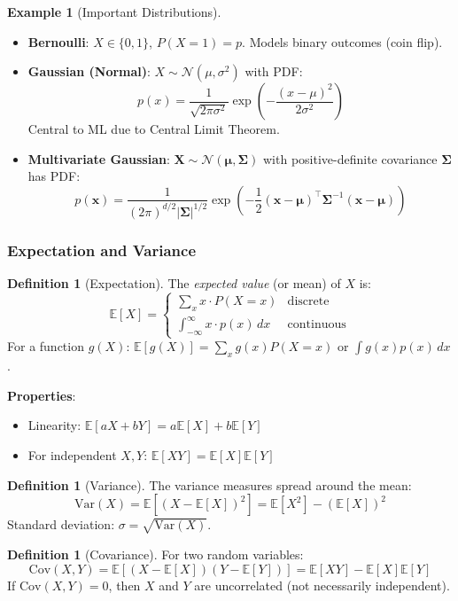 \documentclass[11pt,twoside]{article}
\numberwithin{equation}{section}
\newcommand{\E}{\mathbb{E}}
\newcommand{\Var}{\mathrm{Var}}
\newcommand{\Cov}{\mathrm{Cov}}
\newcommand{\vect}[1]{\bm{#1}}
\newcommand{\mat}[1]{\bm{#1}}
\theoremstyle{plain}
\theoremstyle{definition}
\newtheorem{definition}[theorem]{Definition}
\newtheorem{example}[theorem]{Example}
\theoremstyle{remark}
\begin{document}
\begin{example}[Important Distributions]
\begin{itemize}
\item \textbf{Bernoulli}: $X \in \{0,1\}$, $P(X=1) = p$. Models binary outcomes (coin flip).
\item \textbf{Gaussian (Normal)}: $X \sim \mathcal{N}(\mu, \sigma^2)$ with PDF:
\[
p(x) = \frac{1}{\sqrt{2\pi\sigma^2}} \exp\left(-\frac{(x-\mu)^2}{2\sigma^2}\right)
\]
Central to ML due to Central Limit Theorem.
\item \textbf{Multivariate Gaussian}: $\vect{X} \sim \mathcal{N}(\vect{\mu}, \mat{\Sigma})$ with positive-definite covariance $\mat{\Sigma}$ has PDF:
\[
p(\vect{x}) = \frac{1}{(2\pi)^{d/2}|\mat{\Sigma}|^{1/2}} \exp\left(-\frac{1}{2}(\vect{x}-\vect{\mu})^\top\mat{\Sigma}^{-1}(\vect{x}-\vect{\mu})\right)
\]
\end{itemize}
\end{example}

\subsubsection{Expectation and Variance}

\begin{definition}[Expectation]
The \emph{expected value} (or mean) of $X$ is:
\[
\E[X] = \begin{cases}
\sum_x x \cdot P(X=x) & \text{discrete} \\
\int_{-\infty}^\infty x \cdot p(x)\,dx & \text{continuous}
\end{cases}
\]
For a function $g(X)$: $\E[g(X)] = \sum_x g(x) P(X=x)$ or $\int g(x) p(x)\,dx$.
\end{definition}

\textbf{Properties}:
\begin{itemize}
\item Linearity: $\E[aX + bY] = a\E[X] + b\E[Y]$
\item For independent $X, Y$: $\E[XY] = \E[X]\E[Y]$
\end{itemize}

\begin{definition}[Variance]
The variance measures spread around the mean:
\[
\Var(X) = \E[(X - \E[X])^2] = \E[X^2] - (\E[X])^2
\]
Standard deviation: $\sigma = \sqrt{\Var(X)}$.
\end{definition}

\begin{definition}[Covariance]
For two random variables:
\[
\Cov(X, Y) = \E[(X-\E[X])(Y-\E[Y])] = \E[XY] - \E[X]\E[Y]
\]
If $\Cov(X,Y) = 0$, then $X$ and $Y$ are uncorrelated (not necessarily independent).
\end{definition}
\end{document}
